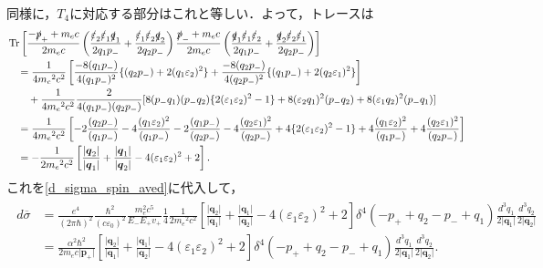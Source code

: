 同様に，$T_4$に対応する部分はこれと等しい．よって，トレースは
\begin{align}
  \begin{split}
    & \operatorname{Tr}\left[ \frac{-\slashed{p}_+ + m_ec}{2m_ec} \left(\frac{\slashed{\varepsilon}_2\slashed{\varepsilon}_1\slashed{q}_1}{2q_1p_-} + \frac{\slashed{\varepsilon}_1\slashed{\varepsilon}_2\slashed{q}_2}{2q_2p_-}\right) \frac{\slashed{p}_- + m_ec}{2m_ec} \left(\frac{\slashed{q}_1\slashed{\varepsilon}_1\slashed{\varepsilon}_2}{2q_1p_-} + \frac{\slashed{q}_2\slashed{\varepsilon}_2\slashed{\varepsilon}_1}{2q_2p_-}\right) \right] \\
    &\quad = \frac{1}{4m_e{}^2c^2}\left[\frac{-8(q_1p_-)}{4(q_1p_-)^2}\{(q_2p_-) + 2(q_1\varepsilon_2)^2\} + \frac{-8(q_2p_-)}{4(q_2p_-)^2}\{(q_1p_-) + 2(q_2\varepsilon_1)^2\} \right] \\
    &\qquad + \frac{1}{4m_e{}^2c^2}\frac{2}{4(q_1p_-)(q_2p_-)}[8(p_-q_1)(p_-q_2)\{2(\varepsilon_1\varepsilon_2)^2-1\} + 8(\varepsilon_2q_1)^2(p_-q_2) + 8(\varepsilon_1q_2)^2(p_-q_1)] \\
    &\quad = \frac{1}{4m_e{}^2c^2}\left[-2\frac{(q_2p_-)}{(q_1p_-)} - 4\frac{(q_1\varepsilon_2)^2}{(q_1p_-)} - 2\frac{(q_1p_-)}{(q_2p_-)} - 4\frac{(q_2\varepsilon_1)^2}{(q_2p_-)} + 4\{2(\varepsilon_1\varepsilon_2)^2-1\} + 4\frac{(q_1\varepsilon_2)^2}{(q_1p_-)} + 4\frac{(q_2\varepsilon_1)^2}{(q_2p_-)}\right] \\
    &\quad = -\frac{1}{2m_e{}^2c^2}\left[ \frac{\lvert\boldsymbol{q}_2\lvert}{\lvert\boldsymbol{q}_1\lvert} + \frac{\lvert\boldsymbol{q}_1\lvert}{\lvert\boldsymbol{q}_2\lvert} - 4(\varepsilon_1\varepsilon_2)^2 + 2 \right].
  \end{split}
\end{align}
これを\eqref{d_sigma_spin_aved}に代入して，
\begin{align}
  \begin{split}
    d\overline{\sigma} &= \frac{e^4}{(2\pi\hbar)^2} \frac{\hbar^2}{(c\varepsilon_0)^2} \frac{m_e^2c^5}{E_-E_+v_+} \frac{1}{4}
    \frac{1}{2m_e{}^2c^2}\left[ \frac{\lvert\boldsymbol{q}_2\lvert}{\lvert\boldsymbol{q}_1\lvert} + \frac{\lvert\boldsymbol{q}_1\lvert}{\lvert\boldsymbol{q}_2\lvert} - 4(\varepsilon_1\varepsilon_2)^2 + 2 \right]
    \delta^4(-p_+ + q_2 - p_- + q_1) \frac{d^3q_1}{2\lvert\boldsymbol{q}_1\rvert} \frac{d^3q_2}{2\lvert\boldsymbol{q}_2\rvert}\\
    &= \frac{\alpha^2\hbar^2}{2m_ec\lvert\boldsymbol{p}_+\rvert}\left[ \frac{\lvert\boldsymbol{q}_2\lvert}{\lvert\boldsymbol{q}_1\lvert} + \frac{\lvert\boldsymbol{q}_1\lvert}{\lvert\boldsymbol{q}_2\lvert} - 4(\varepsilon_1\varepsilon_2)^2 + 2 \right]
    \delta^4(-p_+ + q_2 - p_- + q_1) \frac{d^3q_1}{2\lvert\boldsymbol{q}_1\rvert} \frac{d^3q_2}{2\lvert\boldsymbol{q}_2\rvert}.
  \end{split}
  \label{d_sigma_spin_aved_tred}
\end{align}


